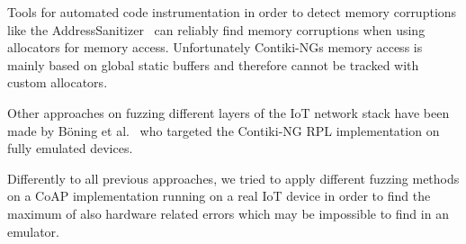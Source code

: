 Tools for automated code instrumentation in order to detect memory corruptions like the AddressSanitizer~\cite{addressSanitizer} can reliably find memory corruptions when using allocators for memory access. Unfortunately Contiki-NGs memory access is mainly based on global static buffers and therefore cannot be tracked with custom allocators.

Other approaches on fuzzing different layers of the IoT network stack have been made by Böning et al.~\cite{PawelLeo} who targeted the Contiki-NG RPL implementation on fully emulated devices.

Differently to all previous approaches, we tried to apply different fuzzing methods on a CoAP implementation running on a real IoT device in order to find the maximum of also hardware related errors which may be impossible to find in an emulator.